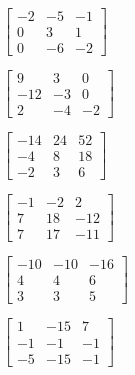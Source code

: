 \begin{exercise}
\begin{Parts}
\item \(\begin{bmatrix} -2 & -5 & -1
\\0 & 3 & 1
\\0 & -6 & -2 \end{bmatrix}\)

\item \(\begin{bmatrix} 9 & 3 & 0
\\-12 & -3 & 0
\\2 & -4 & -2 \end{bmatrix}\)

\begin{reduce}
\item \(\begin{bmatrix} -14 & 24 & 52
\\-4 & 8 & 18
\\-2 & 3 & 6 \end{bmatrix}\)

\item \(\begin{bmatrix} -1 & -2 & 2
\\7 & 18 & -12
\\7 & 17 & -11 \end{bmatrix}\)
\end{reduce}

\item \(\begin{bmatrix} -10 & -10 & -16
\\4 & 4 & 6
\\3 & 3 & 5 \end{bmatrix}\)

\item \(\begin{bmatrix} 1 & -15 & 7
\\-1 & -1 & -1
\\-5 & -15 & -1 \end{bmatrix}\)

\end{Parts}
\end{exercise}






